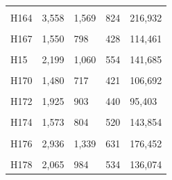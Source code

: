 \documentclass[
  a4paper,
  titlepage]{article}
\begin{document}
\begin{longtable}[t]{lllll}
\cellcolor{gray!6}{H162} & \cellcolor{gray!6}{2,438} & \cellcolor{gray!6}{1,107} & \cellcolor{gray!6}{592} & \cellcolor{gray!6}{164,838}\\
 
H164 & 3,558 & 1,569 & 824 & 216,932\\
 
\cellcolor{gray!6}{H166} & \cellcolor{gray!6}{2,018} & \cellcolor{gray!6}{957} & \cellcolor{gray!6}{547} & \cellcolor{gray!6}{151,066}\\
 
H167 & 1,550 & 798 & 428 & 114,461\\
 
\cellcolor{gray!6}{H168} & \cellcolor{gray!6}{2,807} & \cellcolor{gray!6}{1,227} & \cellcolor{gray!6}{627} & \cellcolor{gray!6}{167,271}\\
 
H15 & 2,199 & 1,060 & 554 & 141,685\\
 
\cellcolor{gray!6}{H169} & \cellcolor{gray!6}{2,004} & \cellcolor{gray!6}{902} & \cellcolor{gray!6}{514} & \cellcolor{gray!6}{141,855}\\
 
H170 & 1,480 & 717 & 421 & 106,692\\
 
\cellcolor{gray!6}{H171} & \cellcolor{gray!6}{3,217} & \cellcolor{gray!6}{1,370} & \cellcolor{gray!6}{693} & \cellcolor{gray!6}{185,038}\\
 
H172 & 1,925 & 903 & 440 & 95,403\\
 
\cellcolor{gray!6}{H173} & \cellcolor{gray!6}{1,960} & \cellcolor{gray!6}{920} & \cellcolor{gray!6}{498} & \cellcolor{gray!6}{125,896}\\
 
H174 & 1,573 & 804 & 520 & 143,854\\
 
\cellcolor{gray!6}{H175} & \cellcolor{gray!6}{1,459} & \cellcolor{gray!6}{677} & \cellcolor{gray!6}{437} & \cellcolor{gray!6}{131,093}\\
 
H176 & 2,936 & 1,339 & 631 & 176,452\\
 
\cellcolor{gray!6}{H177} & \cellcolor{gray!6}{2,335} & \cellcolor{gray!6}{1,008} & \cellcolor{gray!6}{547} & \cellcolor{gray!6}{156,330}\\
 
H178 & 2,065 & 984 & 534 & 136,074\\
 

\end{longtable}
\end{document}
